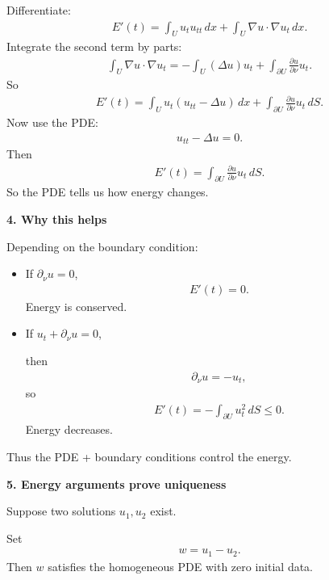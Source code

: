\documentclass[12pt,a4paper]{report}
\begin{document}
\begin{description}
\begin{description}
Differentiate:
\begin{align*}
E'(t) = \int_U u_tu_{tt}\,dx+\int_U \nabla u\cdot\nabla u_t\,dx.
\end{align*}
Integrate the second term by parts:
\begin{align*}
\int_U \nabla u\cdot\nabla u_t = -\int_U (\Delta u)u_t +\int_{\partial U}\frac{\partial u}{\partial\nu}u_t.
\end{align*}
So
\begin{align*}
E'(t) = \int_U u_t(u_{tt}-\Delta u)\,dx +\int_{\partial U}\frac{\partial u}{\partial\nu}u_t\,dS.
\end{align*}
Now use the PDE:
\begin{align*}
u_{tt}-\Delta u=0.
\end{align*}
Then
\begin{align*}
E'(t)=\int_{\partial U}\frac{\partial u}{\partial\nu}u_t\,dS.
\end{align*}
So the PDE tells us how energy changes.

\item \textbf{4. Why this helps}

Depending on the boundary condition:
	\begin{itemize}
    \item If $\partial_\nu u=0$,
\begin{align*}
E'(t)=0.
\end{align*}
Energy is conserved.

    \item If $u_t+\partial_\nu u=0$,

then
\begin{align*}
\partial_\nu u=-u_t,
\end{align*}
so
\begin{align*}
E'(t) = -\int_{\partial U}u_t^2\,dS\le 0.
\end{align*}
Energy decreases.

	\end{itemize}
Thus the PDE + boundary conditions control the energy.

\item \textbf{5. Energy arguments prove uniqueness}

Suppose two solutions $u_1,u_2$ exist.

Set
\begin{align*}
w=u_1-u_2.
\end{align*}
Then $w$ satisfies the homogeneous PDE with zero initial data.


\end{description}
\end{description}
\end{document}
